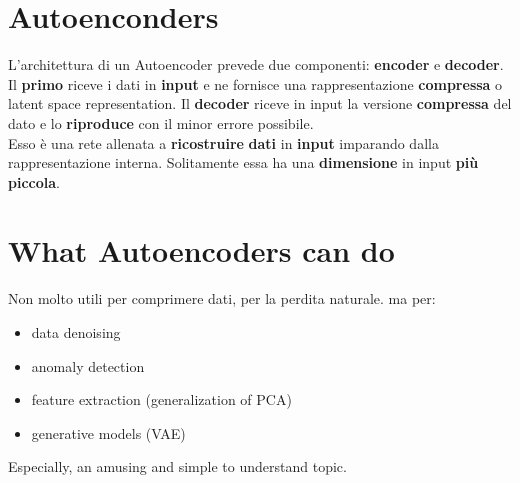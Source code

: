 \documentclass{article}
\begin{document}
\section{Autoenconders}
L'architettura di un Autoencoder prevede due componenti: \textbf{encoder} e \textbf{decoder}. Il \textbf{primo} riceve i dati in \textbf{input} e ne fornisce una rappresentazione
\textbf{compressa} o latent space representation. Il \textbf{decoder} riceve in input la versione \textbf{compressa} del dato e lo \textbf{riproduce} con il minor errore possibile.\\
Esso è una rete allenata a \textbf{ricostruire} \textbf{dati} in \textbf{input} imparando dalla rappresentazione interna. Solitamente essa ha una \textbf{dimensione} in input \textbf{più} \textbf{piccola}.

\section{What Autoencoders can do}
Non molto utili per comprimere dati, per la perdita naturale. ma per:
\begin{itemize}
    \item data denoising
    \item anomaly detection
    \item feature extraction (generalization of PCA)
    \item generative models (VAE)
\end{itemize}
Especially, an amusing and simple to understand topic.
\end{document}
